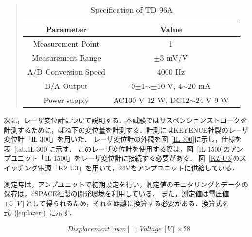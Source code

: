 \documentclass[a4paper,12pt]{article_vdlab_sotsuron}
\begin{document}
\vspace*{1mm}
 \begin{quote}{\small
\begin{table}[htbp]
 \begin{center}
 \caption{Specification of TD-96A}
  \label{tab:TD-96A}
    \begin{tabular}{ccc}\hline
      Parameter & Value \\\hline
      Measurement Point & 1 \\
      Measurement Range & $\pm$3 mV/V\\
      A/D Conversion Speed & 4000 Hz\\
      D/A Output & 0$\pm$1$\sim\pm$10 V, 4$\sim$20 mA\\
      Power supply & AC100 V 12 W, DC12$\sim$24 V 9 W \\\hline
  \end{tabular}
 \end{center}
\end{table}
}\end{quote}

\newpage
次に，レーザ変位計について説明する．本試験ではサスペンションストロークを計測するために，ばね下の変位量を計測する．計測にはKEYENCE社製のレーザ変位計「IL-300」を用いた．
レーザ変位計の外観を図~\ref{IL-300}に示し，仕様を表~\ref{tab:IL-300}に示す．
このレーザ変位計を使用する際は，図~\ref{IL-1500}のアンプユニット「IL-1500」をレーザ変位計に接続する必要がある．
図~\ref{KZ-U3}のスイッチング電源「KZ-U3」を用いて，24Vをアンプユニットに供給している．
\par
測定時は，アンプユニットで初期設定を行い，測定値のモニタリングとデータの保存は，dSPACE社製の開発環境を利用している．
また，測定値は電圧値$\pm{5}[V]$として得られるため，それを距離に換算する必要がある．換算式を式~(\ref{eq:lazer})~に示す．

\vspace*{-2mm}
\begin{eqnarray}
\label{eq:lazer}
 & Displacement[mm] = Voltage\ [V]\times28
\end{eqnarray}
\end{document}
